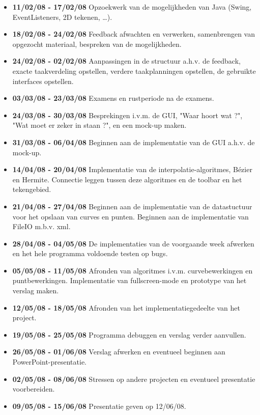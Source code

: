 \documentclass[a4paper,11pt,oneside, titlepage]{article}
\begin{document}
\begin{itemize}
\item \textbf{11/02/08 - 17/02/08}\newline
Opzoekwerk van de mogelijkheden van Java (Swing, EventListeners, 2D tekenen, \ldots).
\item \textbf{18/02/08 - 24/02/08}\newline
Feedback afwachten en verwerken, samenbrengen van opgezocht materiaal, bespreken
van de mogelijkheden.
\item \textbf{24/02/08 - 02/02/08}\newline
Aanpassingen in de structuur a.h.v. de feedback, exacte taakverdeling opstellen, verdere
taakplanningen opstellen, de gebruikte interfaces opstellen.
\item \textbf{03/03/08 - 23/03/08}\newline
Examens en rustperiode na de examens.
\item \textbf{24/03/08 - 30/03/08}\newline
Besprekingen i.v.m. de GUI, "Waar hoort wat ?", "Wat moet er zeker in staan ?", en een mock-up maken.
\item \textbf{31/03/08 - 06/04/08}\newline
Beginnen aan de implementatie van de GUI a.h.v. de mock-up.
\item \textbf{14/04/08 - 20/04/08}\newline
Implementatie van de interpolatie-algoritmes, B\'ezier en Hermite.
Connectie leggen tussen deze algoritmes en de toolbar en het tekengebied.
\item \textbf{21/04/08 - 27/04/08}\newline
Beginnen aan de implementatie van de datastuctuur voor het opslaan van curves en punten.
Beginnen aan de implementatie van FileIO m.b.v. xml.
\item \textbf{28/04/08 - 04/05/08}\newline
De implementaties van de voorgaande week afwerken en het hele programma voldoende testen
op bugs.
\item \textbf{05/05/08 - 11/05/08}\newline
Afronden van algoritmes i.v.m. curvebewerkingen en puntbewerkingen.
Implementatie van fullscreen-mode en prototype van het verslag maken.
\item \textbf{12/05/08 - 18/05/08}\newline
Afronden van het implementatiegedeelte van het project.
\item \textbf{19/05/08 - 25/05/08}\newline
Programma debuggen en verslag verder aanvullen.
\item \textbf{26/05/08 - 01/06/08}\newline
Verslag afwerken en eventueel beginnen aan PowerPoint-presentatie.
\item \textbf{02/05/08 - 08/06/08}\newline
Stressen op andere projecten en eventueel presentatie voorbereiden.
\item \textbf{09/05/08 - 15/06/08}\newline
Presentatie geven op 12/06/08.
\end{itemize}
\newpage
\end{document}
